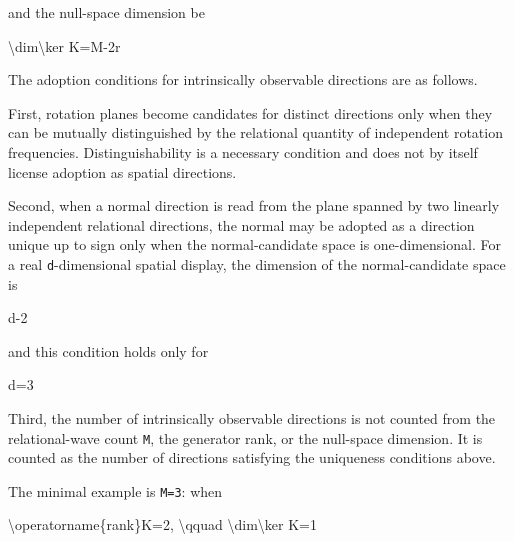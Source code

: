 \documentclass[
  a4paper,
]{article}
\newenvironment{Shaded}{}{}
\newcommand{\NormalTok}[1]{#1}
\begin{document}
and the null-space dimension be

\begin{Shaded}
\begin{Highlighting}[]
\NormalTok{\textbackslash{}dim\textbackslash{}ker K=M{-}2r}
\end{Highlighting}
\end{Shaded}

The adoption conditions for intrinsically observable directions are as
follows.

First, rotation planes become candidates for distinct directions only
when they can be mutually distinguished by the relational quantity of
independent rotation frequencies. Distinguishability is a necessary
condition and does not by itself license adoption as spatial directions.

Second, when a normal direction is read from the plane spanned by two
linearly independent relational directions, the normal may be adopted as
a direction unique up to sign only when the normal-candidate space is
one-dimensional. For a real \texttt{d}-dimensional spatial display, the
dimension of the normal-candidate space is

\begin{Shaded}
\begin{Highlighting}[]
\NormalTok{d{-}2}
\end{Highlighting}
\end{Shaded}

and this condition holds only for

\begin{Shaded}
\begin{Highlighting}[]
\NormalTok{d=3}
\end{Highlighting}
\end{Shaded}

Third, the number of intrinsically observable directions is not counted
from the relational-wave count \texttt{M}, the generator rank, or the
null-space dimension. It is counted as the number of directions
satisfying the uniqueness conditions above.

The minimal example is \texttt{M=3}: when

\begin{Shaded}
\begin{Highlighting}[]
\NormalTok{\textbackslash{}operatorname\{rank\}K=2,}
\NormalTok{\textbackslash{}qquad}
\NormalTok{\textbackslash{}dim\textbackslash{}ker K=1}
\end{Highlighting}
\end{Shaded}
\end{document}
